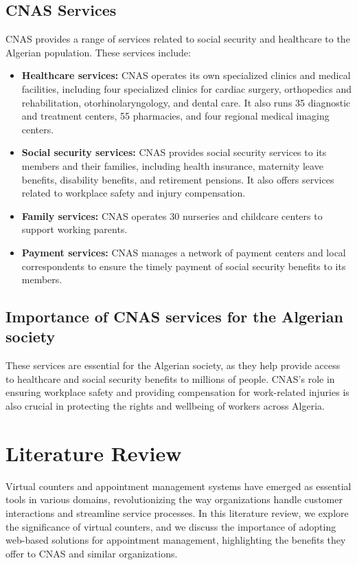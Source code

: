 \subsection{CNAS Services}
CNAS provides a range of services related to social security and healthcare to the Algerian population. These services include:
\begin{itemize}
    \item \textbf{Healthcare services:} CNAS operates its own specialized clinics and medical facilities, including four specialized clinics for cardiac surgery, orthopedics and rehabilitation, otorhinolaryngology, and dental care. It also runs 35 diagnostic and treatment centers, 55 pharmacies, and four regional medical imaging centers.

    \item \textbf{Social security services:} CNAS provides social security services to its members and their families, including health insurance, maternity leave benefits, disability benefits, and retirement pensions. It also offers services related to workplace safety and injury compensation.

    \item \textbf{Family services:} CNAS operates 30 nurseries and childcare centers to support working parents.

    \item \textbf{Payment services:} CNAS manages a network of payment centers and local correspondents to ensure the timely payment of social security benefits to its members.
\end{itemize}
\subsection{  Importance of CNAS services for the Algerian society}
These services are essential for the Algerian society, as they help provide access to healthcare and social security benefits to millions of people. CNAS's role in ensuring workplace safety and providing compensation for work-related injuries is also crucial in protecting the rights and wellbeing of workers across Algeria.

\section{Literature Review}
\label{sec:literature-review}

Virtual counters and appointment management systems have emerged as essential tools in various domains, revolutionizing the way organizations handle customer interactions and streamline service processes. In this literature review, we explore the significance of virtual counters, and we discuss the importance of adopting web-based solutions for appointment management, highlighting the benefits they offer to CNAS and similar organizations.

